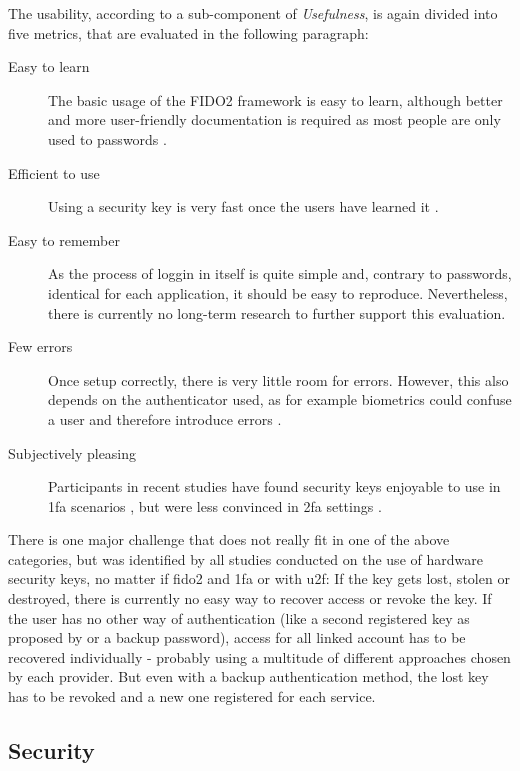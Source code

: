 The usability, according to \cite[25 \psq]{nielsen1993} a sub-component of \emph{Usefulness}, is again divided into five metrics, that are evaluated in the following paragraph:

\begin{description}
    \item[Easy to learn] The basic usage of the FIDO2 framework is easy to learn, although better and more user-friendly documentation is required as most people are only used to passwords \cite{lyastani2020,hunt2018b,das2018}.
    \item[Efficient to use] Using a security key is very fast once the users have learned it \cite{lang2017}.
    \item[Easy to remember] As the process of loggin in itself is quite simple and, contrary to passwords, identical for each application, it should be easy to reproduce. Nevertheless, there is currently no long-term research to further support this evaluation.
    \item[Few errors] Once setup correctly, there is very little room for errors. However, this also depends on the authenticator used, as for example biometrics could confuse a user and therefore introduce errors \cite{lyastani2020}.
    \item[Subjectively pleasing] Participants in recent studies have found security keys enjoyable to use in \ac{1fa} scenarios \citep{lyastani2020}, but were less convinced in \ac{2fa} settings \cite{das2018}.
\end{description}

There is one major challenge that does not really fit in one of the above categories, but was identified by all studies conducted on the use of hardware security keys, no matter if \ac{fido2} and \ac{1fa} or with \ac{u2f}: If the key gets lost, stolen or destroyed, there is currently no easy way to recover access or revoke the key. If the user has no other way of authentication (like a second registered key as proposed by \cite{gomi2019} or a backup password), access for all linked account has to be recovered individually - probably using a multitude of different approaches chosen by each provider. But even with a backup authentication method, the lost key has to be revoked and a new one registered for each service.\\

\subsection{Security}


